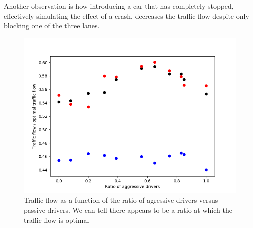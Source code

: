 \documentclass[11pt,a4paper,twocolumn]{article}
\begin{document}
Another observation is how introducing a car that has completely stopped, effectively simulating the effect of a crash, decreases the traffic flow despite only blocking one of the three lanes.

\begin{figure}[ht]
    \centering
    \includegraphics[scale=0.4]{figs/jam_flow_aggresives_150.png}
    \caption{Traffic flow as a function of the ratio of agressive drivers versus passive drivers. We can tell there appears to be a ratio at which the traffic flow is optimal}
    \label{jam_flow}
\end{figure}
\end{document}
